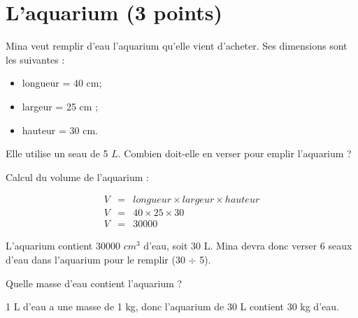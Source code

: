 \section{L'aquarium (3 points)}

Mina veut remplir d'eau l'aquarium qu'elle vient d'acheter. Ses dimensions sont les suivantes :
\begin{itemize}
	\item longueur = 40 cm;
	\item largeur = 25 cm ;
	\item hauteur = 30 cm.
\end{itemize} 
\begin{questions}
	\question[2] Elle utilise un seau de 5 $L$. Combien doit-elle en verser pour emplir l'aquarium ?
	\begin{solution}
		Calcul du volume de l'aquarium :
		
		\begin{eqnarray*}
			V &= & longueur \times largeur \times hauteur \\
			V &=& 40 \times 25 \times 30 \\
			V &=& \num{30000} 
		\end{eqnarray*}
	
	L'aquarium contient \num{30000} $cm^3$ d'eau, soit 30 L. Mina devra donc verser 6 seaux d'eau dans l'aquarium pour le remplir (30 $\div$ 5).
	\end{solution}
	
	\question[1] Quelle masse d'eau contient l'aquarium ?
	\begin{solution}
		1 L d'eau a une masse de 1 kg, donc l'aquarium de 30 L contient 30 kg d'eau.
	\end{solution}
\end{questions}